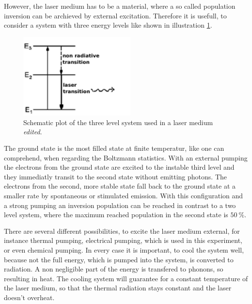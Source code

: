 However, the laser medium has to be a material, where a so called population inversion can be archieved by external excitation.
Therefore it is usefull, to consider a system with three energy levels like shown in illustration \ref{fig:threelevelsystem}.
\begin{figure}
  \centering
  \includegraphics[height = 4.3cm]{Ordnername/threelevel_edit.pdf}
  \caption{Schematic plot of the three level system used in a laser medium \cite{threelevel} \textit{edited}.}
  \label{fig:threelevelsystem}
\end{figure}
The ground state is the most filled state at finite temperatur, like one can comprehend, when regarding the Boltzmann statistics.
With an external pumping the electrons from the ground state are excited to the instable third level and they immediatly transit to the second state
without emitting photons. The electrons from the second, more stable state fall back to the ground state at a smaller rate by spontaneous or stimulated emission.
With this configuration and a strong pumping an inversion population can be reached in contrast
to a two level system, where the maximum reached population in the second state is $\SI{50}{\percent}$.

There are several different possibilities, to excite the laser medium external, for instance thermal pumping,
electrical pumping, which is used in this experiment, or even chemical pumping.
In every case it is important, to cool the system well, because not the full energy, which is pumped into the system,
is converted to radiation. A non negligible part of the energy is transfered to phonons, so resulting in heat.
The cooling system will guarantee for a constant temperature of the laser medium, so that the thermal radiation stays constant
and the laser doesn't overheat.

